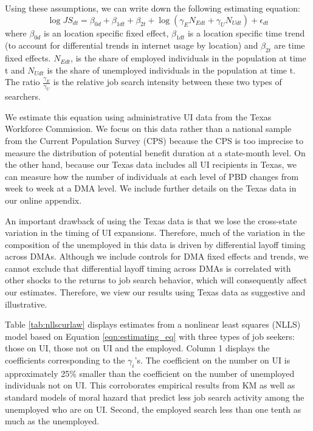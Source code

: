 \documentclass[12pt]{article}
\begin{document}
\begin{spacing}{2}
Using these assumptions, we can write down the following estimating equation:
\begin{equation}\label{eqn:estimating_eq}
\log{JS}_{dt} =\beta_{0d} + \beta_{1dt} + \beta_{2t}+\log{(\gamma_{E}N_{Edt}+\gamma_{U}N_{Udt})}+\epsilon_{dt}
\end{equation}
where $\beta_{0d}$ is an location specific fixed effect, $\beta_{1dt}$ is a location specific time trend (to account for differential trends in internet usage by location) and $\beta_{2t}$ are time fixed effects. $N_{Edt}$, is the share of employed individuals in the population at time t and $N_{Udt}$ is the share of unemployed individuals in the population at time t. The ratio  $\frac{\gamma_{E}}{\gamma_{U}}$ is the relative job search intensity between these two types of searchers.

We estimate this equation using administrative UI data from the Texas Workforce Commission. We focus on this data rather than a national sample from the Current Population Survey (CPS) because the CPS is too imprecise to measure the distribution of potential benefit duration at a state-month level. On the other hand, because our Texas data includes all UI recipients in Texas, we can measure how the number of individuals at each level of PBD changes from week to week at a DMA level. We include further details on the Texas data in our online appendix. 

An important drawback of using the Texas data is that we lose the cross-state variation in the timing of UI expansions. Therefore, much of the variation in the composition of the unemployed in this data is driven by differential layoff timing across DMAs. Although we include controls for DMA fixed effects and trends, we cannot exclude that differential layoff timing across DMAs is correlated with other shocks to the returns to job search behavior, which will consequently affect our estimates. Therefore, we view our results using Texas data as suggestive and illustrative.

Table \ref{tab:nllscurlaw} displays estimates from a nonlinear least squares (NLLS) model based on Equation \ref{eqn:estimating_eq} with three types of job seekers: those on UI, those not on UI and the employed. Column 1 displays the coefficients corresponding to the $\gamma_i$'s. The coefficient on the number on UI is approximately 25\% smaller than the coefficient on the number of unemployed individuals not on UI. This corroborates empirical results from KM as well as standard models of moral hazard that predict less job search activity among the unemployed who are on UI. Second, the employed search less than one tenth as much as the unemployed.


\end{spacing}
\end{document}
